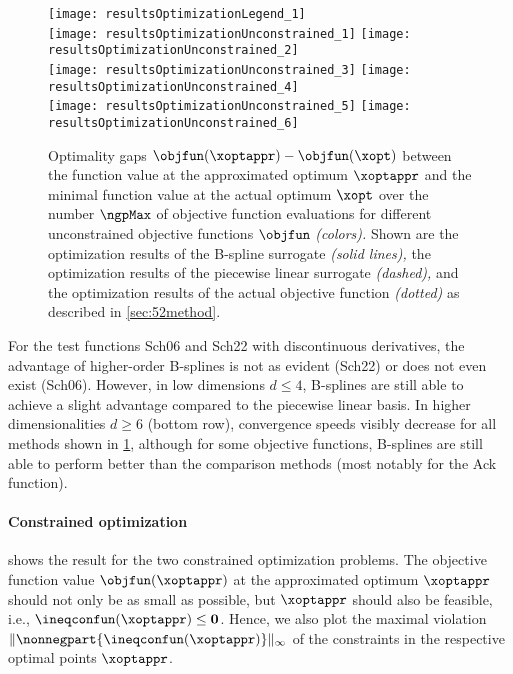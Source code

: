 \begin{figure}
  \texttt{[image: resultsOptimizationLegend\_1]}\\[2mm]%
  \texttt{[image: resultsOptimizationUnconstrained\_1]}%
  \hfill%
  \texttt{[image: resultsOptimizationUnconstrained\_2]}%
  \\[2mm]%
  \texttt{[image: resultsOptimizationUnconstrained\_3]}%
  \hfill%
  \texttt{[image: resultsOptimizationUnconstrained\_4]}%
  \\[2mm]%
  \texttt{[image: resultsOptimizationUnconstrained\_5]}%
  \hfill%
  \texttt{[image: resultsOptimizationUnconstrained\_6]}%
  \caption[Optimality gaps for different objective functions (unconstrained)]{%
    Optimality gaps $\objfun(\xoptappr) - \objfun(\xopt)$ between
    the function value at the approximated optimum $\xoptappr$ and
    the minimal function value at the actual optimum $\xopt$
    over the number $\ngpMax$ of objective function evaluations
    for different unconstrained
    objective functions $\objfun$ \emph{(colors).}
    Shown are the optimization results of the B-spline surrogate
    \emph{(solid lines),}
    the optimization results of the piecewise linear surrogate
    \emph{(dashed),} and
    the optimization results of the actual objective function
    \emph{(dotted)} as described in \cref{sec:52method}.%
  }%
  \label{fig:resultsOptimizationUnconstrainedTestFunctions}%
\end{figure}

For the test functions Sch06 and Sch22 with discontinuous derivatives,
the advantage of higher-order B-splines is not as evident (Sch22) or
does not even exist (Sch06).
However, in low dimensions $d \le 4$, B-splines are still able
to achieve a slight advantage compared to the piecewise linear basis.
In higher dimensionalities $d \ge 6$ (bottom row),
convergence speeds visibly decrease for all methods shown in
\cref{fig:resultsOptimizationUnconstrainedTestFunctions},
although for some objective functions, B-splines are still able
to perform better than the comparison methods
(most notably for the Ack function).

\paragraph{Constrained optimization}

shows the result for the two constrained optimization problems.
The objective function value $\objfun(\xoptappr)$
at the approximated optimum $\xoptappr$ should not only
be as small as possible, but $\xoptappr$ should also be feasible, i.e.,
$\ineqconfun(\xoptappr) \le \*0$.
Hence, we also plot the maximal violation
$\norm[\infty]{\nonnegpart{\ineqconfun(\xoptappr)}}$
of the constraints in the respective optimal points $\xoptappr$.

